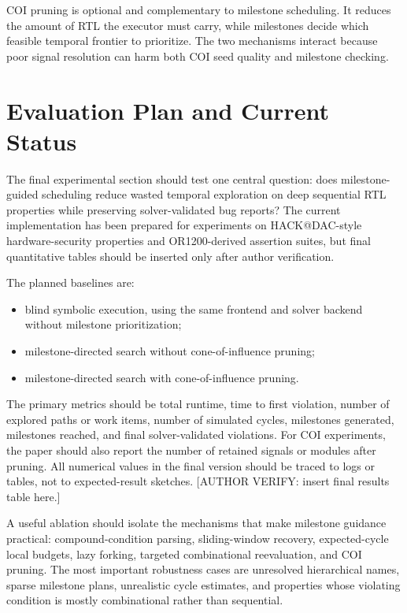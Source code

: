 \documentclass[conference]{IEEEtran}
\begin{document}
COI pruning is optional and complementary to milestone scheduling. It reduces the amount of RTL the executor must carry, while milestones decide which feasible temporal frontier to prioritize. The two mechanisms interact because poor signal resolution can harm both COI seed quality and milestone checking.

\section{Evaluation Plan and Current Status}
\label{sec:evaluation}
The final experimental section should test one central question: does milestone-guided scheduling reduce wasted temporal exploration on deep sequential RTL properties while preserving solver-validated bug reports? The current implementation has been prepared for experiments on HACK@DAC-style hardware-security properties and OR1200-derived assertion suites, but final quantitative tables should be inserted only after author verification.

The planned baselines are:
\begin{itemize}
    \item blind symbolic execution, using the same frontend and solver backend without milestone prioritization;
    \item milestone-directed search without cone-of-influence pruning;
    \item milestone-directed search with cone-of-influence pruning.
\end{itemize}

The primary metrics should be total runtime, time to first violation, number of explored paths or work items, number of simulated cycles, milestones generated, milestones reached, and final solver-validated violations. For COI experiments, the paper should also report the number of retained signals or modules after pruning. All numerical values in the final version should be traced to logs or tables, not to expected-result sketches. [AUTHOR VERIFY: insert final results table here.]

A useful ablation should isolate the mechanisms that make milestone guidance practical: compound-condition parsing, sliding-window recovery, expected-cycle local budgets, lazy forking, targeted combinational reevaluation, and COI pruning. The most important robustness cases are unresolved hierarchical names, sparse milestone plans, unrealistic cycle estimates, and properties whose violating condition is mostly combinational rather than sequential.
\end{document}
